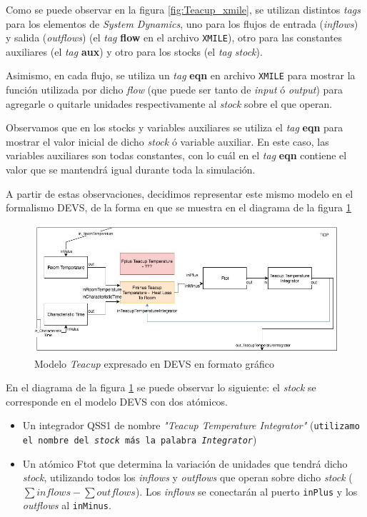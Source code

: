 Como se puede observar en la figura \ref{fig:Teacup_xmile}, se utilizan distintos \textit{tags} para los elementos de \textit{System Dynamics}, uno para los flujos de entrada (\textit{inflows}) y salida (\textit{outflows}) (el \textit{tag} \textbf{flow} en el archivo \texttt{XMILE}), otro para las constantes auxiliares (el  \textit{tag} \textbf{aux}) y otro para los stocks (el \textit{tag} \textit{stock}). 

Asimismo, en cada flujo, se utiliza un \textit{tag} \textbf{eqn} en archivo \texttt{XMILE} para mostrar la función utilizada por dicho \textit{flow} (que puede ser tanto de \textit{input} ó \textit{output}) para agregarle o quitarle unidades respectivamente al \textit{stock} sobre el que operan. 

Observamos que en los stocks y variables auxiliares se utiliza el \textit{tag} \textbf{eqn} para mostrar el valor inicial de dicho \textit{stock} ó variable auxiliar. En este caso, las variables auxiliares son todas constantes, con lo cuál en el \textit{tag} \textbf{eqn} contiene el valor que se mantendrá igual durante toda la simulación.

A partir de estas observaciones, decidimos representar este mismo modelo en el formalismo DEVS, de la forma en que se muestra en el diagrama de la figura \ref{fig:Teacup_devs_flattened}

\begin{figure}[!h]
\centering
\includegraphics[scale=0.5]{imagenes/Teacup_devs_flattened}
\caption{Modelo \textit{Teacup} expresado en DEVS en formato gráfico}
\label{fig:Teacup_devs_flattened}
\end{figure}

En el diagrama de la figura \ref{fig:Teacup_devs_flattened} se puede observar lo siguiente: el \textit{stock} se corresponde en el modelo DEVS con dos atómicos.

\begin{itemize}
	\item Un integrador QSS1\cite{qss} de nombre \textit{"Teacup Temperature Integrator"} (\texttt{utilizamo el nombre del \textit{stock} más la palabra \textit{Integrator}})
	\item Un atómico Ftot que determina la variación de unidades que tendrá dicho \textit{stock}, utilizando todos los \textit{inflows} y \textit{outflows} que operan sobre dicho \textit{stock} ($\sum inflows - \sum outflows $). Los \textit{inflows} se conectarán al puerto \texttt{inPlus} y los \textit{outflows} al \texttt{inMinus}. 
\end{itemize}

